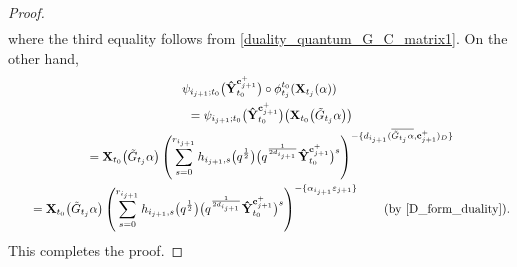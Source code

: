 \begin{proof}
\begin{gather*}
 \end{gather*}
 where the third equality follows from \eqref{duality_quantum_G_C_matrix1}.
 On the other hand,
 \begin{gather*}
 \psi_{i_{j+1};t_{0}}\bigl(\mathbf{\hat{Y}}_{t_{0}}^{\mathbf{c}_{j+1}^{+}}\bigr)\circ\phi_{t_{j}}^{t_{0}}(\mathbf{X}_{t_{j}}(\alpha))\\
\qquad =\psi_{i_{j+1};t_{0}}\bigl(\mathbf{\hat{Y}}_{t_{0}}^{\mathbf{c}_{j+1}^{+}}\bigr)\bigl(\mathbf{X}_{t_{0}}\bigl(\tilde{G}_{t_{j}}\alpha\bigr)\bigr)\\
\qquad =\mathbf{X}_{t_{0}}\bigl(\tilde{G}_{t_{j}}\alpha\bigr)\left(\sum\limits_{s=0}^{r_{i_{j+1}}} h_{i_{j+1},s}\bigl(q^{\frac{1}{2}}\bigr)\bigl(q^{\frac{1}{2d_{i_{j+1}}}}\mathbf{\hat{Y}}_{t_{0}}^{\mathbf{c}_{j+1}^{+}}\bigr)^{s}\right)^{-\{d_{i_{j+1}}(\overline{\tilde{G}_{t_{j}}\alpha},\mathbf{c}_{j+1}^{+})_D\}}\\
\qquad =\mathbf{X}_{t_{0}}\bigl(\tilde{G}_{t_{j}}\alpha\bigr)\left(\sum\limits_{s=0}^{r_{i_{j+1}}} h_{i_{j+1},s}\bigl(q^{\frac{1}{2}}\bigr)\bigl(q^{\frac{1}{2d_{i_{j+1}}}}\mathbf{\hat{Y}}_{t_{0}}^{\mathbf{c}_{j+1}^{+}}\bigr)^{s}\right)^{-\{\alpha_{i_{j+1}}\varepsilon_{j+1}\}}\qquad\text{(by \eqref{D_form_duality})}.
 \end{gather*}
 This completes the proof.
\end{proof}

